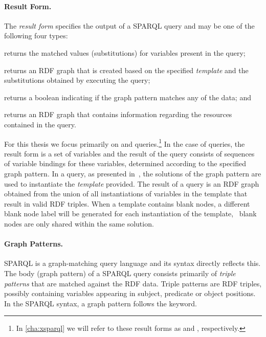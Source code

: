 \paragraph*{Result Form.}
%
The \emph{result form} specifies the output of a SPARQL query and may be one of the following four types:
%
\begin{description}[noitemsep]
\item[\SELECT:] returns the matched values (substitutions) for variables present in the query;
\item[\CONSTRUCT:] returns an \ac{RDF} graph that is created based on the specified \emph{template} and the
  substitutions obtained by executing the query;
\item[\ASK:] returns a boolean indicating if the graph pattern matches any of the data; and
\item[\DESCRIBE:] returns an \ac{RDF} graph that contains information regarding the resources contained in
  the query.
\end{description}
% 
For this thesis we focus primarily on \SELECT and \CONSTRUCT queries.\footnote{In \cref{cha:xsparql} we will refer to
  these result forms as \SparqlForClause and \ConstructClause, respectively.}
%
In the case of \SELECT queries, the result form is a set of variables and the result of the query consists of sequences
of variable bindings for these variables, determined according to the specified graph pattern.
%
In a \CONSTRUCT query, as presented in~\citet[Section 10.2]{PrudhommeauxSeaborne:2008aa}, the solutions of the graph
pattern are used to instantiate the \emph{template} provided. The result of a \CONSTRUCT query is an \ac{RDF} graph
obtained from the union of all instantiations of variables in the template that result in valid \ac{RDF} triples.
%
When a \CONSTRUCT template contains blank nodes, a different blank node label will be generated for each instantiation of
the template, \ie~blank nodes are only shared within the same solution.
%


\paragraph*{Graph Patterns.}%
%
SPARQL is a graph-matching query language and its syntax directly reflects this.  The body (graph pattern) of a SPARQL
query consists primarily of \emph{triple patterns} that are matched against the \ac{RDF} data.  Triple patterns are
\ac{RDF} triples, possibly containing variables appearing in subject, predicate or object positions.
%
In the SPARQL syntax, a graph pattern follows the \WHERE keyword.

